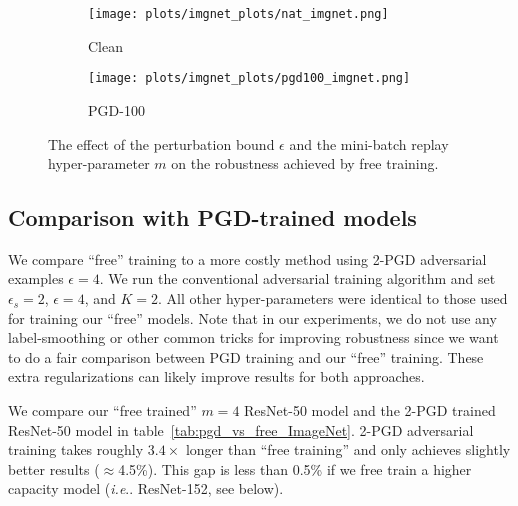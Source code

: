\documentclass{article}
\makeatletter
\DeclareRobustCommand\onedot{\futurelet\@let@token\@onedot}
\def\@onedot{\ifx\@let@token.\else.\null\fi\xspace}
\def\ie{\emph{i.e}\onedot} \def\Ie{\emph{I.e}\onedot}
\makeatother
\begin{document}
\begin{figure}
\centering
\begin{subfigure}{.4\textwidth}
    \centering
    \texttt{[image: plots/imgnet\_plots/nat\_imgnet.png]}
    \caption{Clean}
    \label{fig:imgnet_nat}
\end{subfigure}
\begin{subfigure}{.4\textwidth}
    \texttt{[image: plots/imgnet\_plots/pgd100\_imgnet.png]}
    \caption{PGD-100}
    \label{fig:imgnet_pgd100}
\end{subfigure}\hfill
\caption{The effect of the perturbation bound $\epsilon$ and the mini-batch replay hyper-parameter $m$ on the robustness achieved by free training.}
\label{fig:imgnet_plots}
\end{figure}


\subsection*{Comparison with PGD-trained models}
We compare ``free'' training to a more costly method using 2-PGD adversarial examples $\epsilon=4$. We run the conventional adversarial training algorithm and set $\epsilon_s=2$, $\epsilon=4$, and $K=2$. All other hyper-parameters were identical to those used for training our ``free'' models. Note that in our experiments, we do not use any label-smoothing or other common tricks for improving robustness since we want to do a fair comparison between PGD training and our ``free'' training. These extra regularizations can likely improve results for both approaches.

We compare our ``free trained'' $m=4$ ResNet-50 model and the 2-PGD trained ResNet-50 model in table~\ref{tab:pgd_vs_free_ImageNet}. 2-PGD adversarial training takes roughly $3.4\times$ longer than ``free training'' and only achieves slightly better results ($\approx$4.5\%). This gap is less than 0.5\% if we free train a higher capacity model (\ie ResNet-152, see below).
\end{document}
